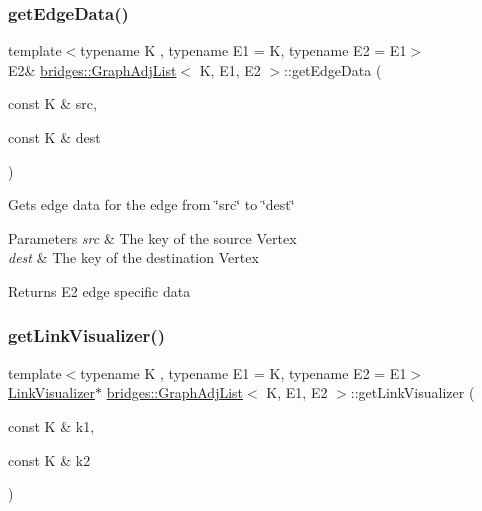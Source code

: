\subsubsection{\texorpdfstring{get\+Edge\+Data()}{getEdgeData()}}
{\footnotesize\ttfamily template$<$typename K , typename E1  = K, typename E2  = E1$>$ \\
E2\& \mbox{\hyperlink{classbridges_1_1_graph_adj_list}{bridges\+::\+Graph\+Adj\+List}}$<$ K, E1, E2 $>$\+::get\+Edge\+Data (\begin{DoxyParamCaption}\item[{const K \&}]{src,  }\item[{const K \&}]{dest }\end{DoxyParamCaption})\hspace{0.3cm}{\ttfamily [inline]}}

Gets edge data for the edge from \char`\"{}src\char`\"{} to \char`\"{}dest\char`\"{}


\begin{DoxyParams}{Parameters}
{\em src} & The key of the source Vertex \\
\hline
{\em dest} & The key of the destination Vertex\\
\hline
\end{DoxyParams}
\begin{DoxyReturn}{Returns}
E2 edge specific data 
\end{DoxyReturn}
\mbox{\label{classbridges_1_1_graph_adj_list_a6e065b1411388387ff1e4df9227ce480}} 
\subsubsection{\texorpdfstring{get\+Link\+Visualizer()}{getLinkVisualizer()}}
{\footnotesize\ttfamily template$<$typename K , typename E1  = K, typename E2  = E1$>$ \\
\mbox{\hyperlink{classbridges_1_1_link_visualizer}{Link\+Visualizer}}$\ast$ \mbox{\hyperlink{classbridges_1_1_graph_adj_list}{bridges\+::\+Graph\+Adj\+List}}$<$ K, E1, E2 $>$\+::get\+Link\+Visualizer (\begin{DoxyParamCaption}\item[{const K \&}]{k1,  }\item[{const K \&}]{k2 }\end{DoxyParamCaption})\hspace{0.3cm}{\ttfamily [inline]}}


